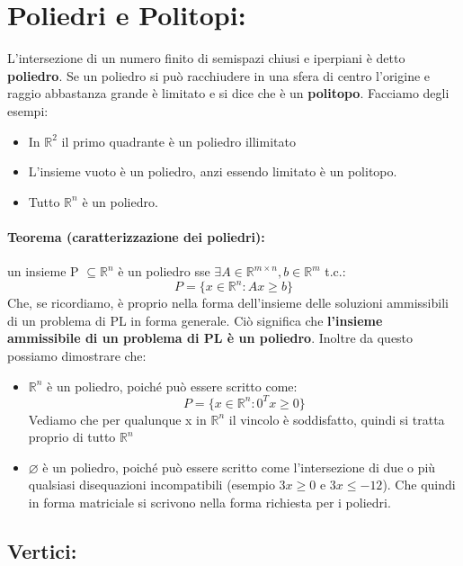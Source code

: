 \section{Poliedri e Politopi:} L'intersezione di un numero finito di semispazi chiusi e iperpiani è detto \textbf{poliedro}. Se un poliedro si può racchiudere in una sfera di centro l'origine e raggio abbastanza grande è limitato e si dice che è un \textbf{politopo}. Facciamo degli esempi:
\begin{itemize}
    \item In $\mathbb{R}^2$ il primo quadrante è un poliedro illimitato
    \item L'insieme vuoto è un poliedro, anzi essendo limitato è un politopo.
    \item Tutto $\mathbb{R}^n$ è un poliedro. 
\end{itemize}

\paragraph{Teorema (caratterizzazione dei poliedri):} un insieme P $\subseteq \mathbb{R}^n$ è un poliedro sse $\exists A \in \mathbb{R}^{m\times n}, b \in \mathbb{R}^m$ t.c.:
\begin{equation*}
    P = \{x \in \mathbb{R}^n: Ax \geq b\}
\end{equation*}
Che, se ricordiamo, è proprio nella forma dell'insieme delle soluzioni ammissibili di un problema di PL in forma generale. Ciò significa che \textbf{l'insieme ammissibile di un problema di PL è un poliedro}. Inoltre da questo possiamo dimostrare che:
\begin{itemize}
    \item $\mathbb{R}^n$ è un poliedro, poiché può essere scritto come:
    \begin{equation*}
        P = \{x \in \mathbb{R}^n: 0^Tx \geq 0\}
    \end{equation*}
    Vediamo che per qualunque x in $\mathbb{R}^n$ il vincolo è soddisfatto, quindi si tratta proprio di tutto $\mathbb{R}^n$
    \item $\varnothing$ è un poliedro, poiché può essere scritto come l'intersezione di due o più qualsiasi disequazioni incompatibili (esempio $3x \geq 0$ e $3x \leq -12$). Che quindi in forma matriciale si scrivono nella forma richiesta per i poliedri.
\end{itemize}


\subsection{Vertici:}

